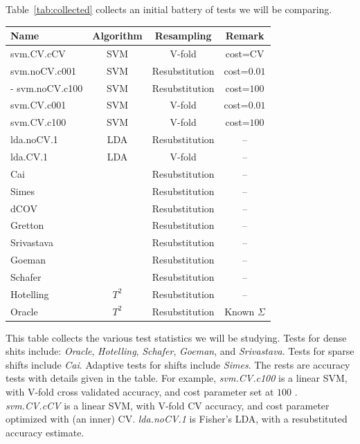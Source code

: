 \documentclass[journal]{IEEEtran}
\begin{document}
\bigskip

Table~\ref{tab:collected} collects an initial battery of tests we will be comparing. 
\begin{tcolorbox}
	\centering
	\footnotesize
	\begin{tabular}{l|c|c|c}
		Name & Algorithm & Resampling & Remark\\ 
		\hline
		\hline
		svm.CV.cCV 	& SVM & V-fold  & cost=CV \\ 
		svm.noCV.c001 	& SVM & Resubstitution  & cost=$0.01$ \\ -
		svm.noCV.c100 	& SVM & Resubstitution  & cost=$100$ \\ 
		svm.CV.c001	& SVM & V-fold 		    & cost=$0.01$ \\ 
		svm.CV.c100	& SVM & V-fold 		    & cost=$100$ \\ 
		lda.noCV.1 	& LDA & Resubstitution 	&  --\\ 
		lda.CV.1 	& LDA & V-fold 			&  -- \\ 
		Cai & \cite{cai_two-sample_2013} & Resubstitution & -- \\ 
		Simes & \cite{simes1986improved} & Resubstitution & -- \\ 
		dCOV & \cite{szekely2004testing} & Resubstitution & -- \\ 
		Gretton & \cite{gretton_kernel_2012-1} & Resubstitution & -- \\ 
		Srivastava & \cite{srivastava_test_2008} & Resubstitution & -- \\ 
		Goeman & \cite{goeman2006testing} & Resubstitution & -- \\ 
		Schafer & \cite{schafer_shrinkage_2005} & Resubstitution & -- \\ 
		Hotelling & $T^2$ & Resubstitution & -- \\
		Oracle & $T^2$ & Resubstitution & Known $\Sigma$\\ 
	\end{tabular} 
	\captionsetup{type=table}
	\caption{\footnotesize
		This table collects the various test statistics we will be studying. 
		Tests for dense shits include: \textit{Oracle}, \textit{Hotelling}, \textit{Schafer}, \textit{Goeman}, and \textit{Srivastava}.
		Tests for sparse shifts include \textit{Cai}.
		Adaptive tests for shifts include \textit{Simes}.
		The rests are accuracy tests with details given in the table. 	
		For example, \textit{svm.CV.c100} is a linear SVM, with V-fold cross validated accuracy, and cost parameter set at $100$ \cite{meyer_e1071:_2015}.
		\textit{svm.CV.cCV} is a linear SVM, with V-fold CV accuracy, and cost parameter optimized with (an inner) CV. 
		\textit{lda.noCV.1} is Fisher's LDA, with a resubstituted accuracy estimate.
		}
	\label{tab:collected}
\end{tcolorbox}
\end{document}
